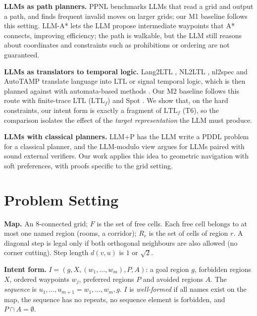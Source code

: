 \documentclass[letterpaper, 10 pt, conference]{ieeeconf}
\newcommand{\Lt}{\mathrm{LTL}_f}
\begin{document}
\textbf{LLMs as path planners.} PPNL \cite{aghzal2023ppnl} benchmarks LLMs that read a
grid and output a path, and finds frequent invalid moves on larger grids; our M1
baseline follows this setting. LLM-A* \cite{meng2024llmastar} lets the LLM propose
intermediate waypoints that A* connects, improving efficiency; the path is walkable,
but the LLM still reasons about coordinates and constraints such as prohibitions or
ordering are not guaranteed.

\textbf{LLMs as translators to temporal logic.} Lang2LTL \cite{liu2023lang2ltl},
NL2LTL \cite{fuggitti2023nl2ltl}, nl2spec \cite{cosler2023nl2spec} and AutoTAMP
\cite{chen2024autotamp} translate language into LTL or signal temporal logic, which is
then planned against with automata-based methods \cite{kressgazit2009,smith2011}. Our
M2 baseline follows this route with finite-trace LTL ($\Lt$) \cite{degiacomo2013} and
Spot \cite{duretlutz2022}. We show that, on the hard constraints, our intent form is
exactly a fragment of $\Lt$ (T6), so the comparison isolates the effect of the
\emph{target representation} the LLM must produce.

\textbf{LLMs with classical planners.} LLM+P \cite{liu2023llmp} has the LLM write a PDDL
problem for a classical planner, and the LLM-modulo view \cite{kambhampati2024}
argues for LLMs paired with sound external verifiers. Our work applies this idea to
geometric navigation with soft preferences, with proofs specific to the grid setting.

\section{Problem Setting}

\textbf{Map.} An 8-connected grid; $F$ is the set of free cells. Each free cell belongs
to at most one named region (rooms, a corridor); $R_r$ is the set of cells of region $r$.
A diagonal step is legal only if both orthogonal neighbours are also allowed (no corner
cutting). Step length $d(v,u)$ is $1$ or $\sqrt2$.

\textbf{Intent form.} $I = (g, X, (w_1,\dots,w_m), P, A)$: a goal region $g$, forbidden
regions $X$, ordered waypoints $w_j$, preferred regions $P$ and avoided regions $A$.
The \emph{sequence} is $u_1,\dots,u_{m+1} = w_1,\dots,w_m,g$. $I$ is \emph{well-formed}
if all names exist on the map, the sequence has no repeats, no sequence element is
forbidden, and $P \cap A = \emptyset$.
\end{document}
